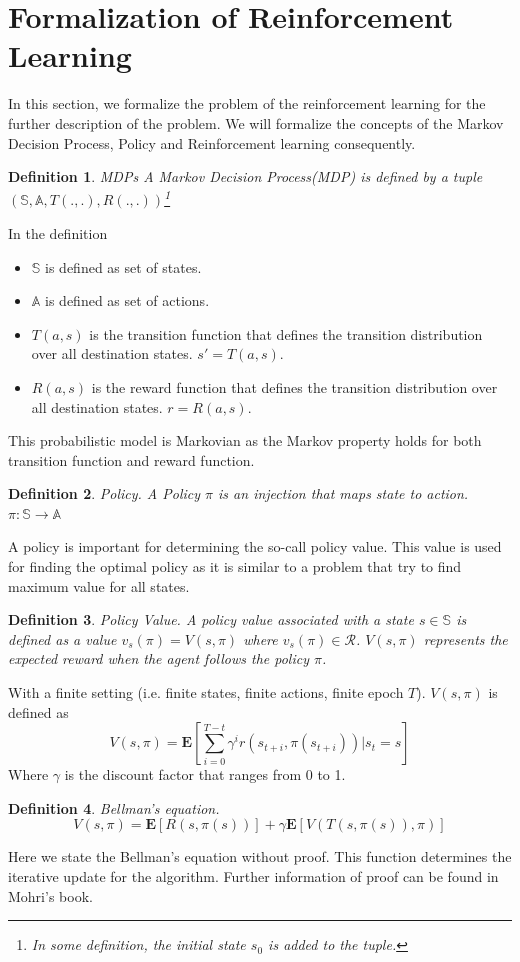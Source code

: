 \documentclass{article}
\newtheorem{mydef}{Definition}
\begin{document}
\section{Formalization of Reinforcement Learning}
In this section, we formalize the problem of the reinforcement learning for the further description of the problem. We will formalize the concepts of the Markov Decision Process, Policy and Reinforcement learning consequently.
\begin{mydef}
MDPs
A Markov Decision Process(MDP) is defined by a tuple $(\mathbb{S},\mathbb{A},T(.,.),R(.,.))$\footnote{In some definition, the initial state $s_0$ is added to the tuple.}
\end{mydef}
In the definition
\begin{itemize}
\item $\mathbb{S}$ is defined as set of states.
\item $\mathbb{A}$ is defined as set of actions.
\item $T(a,s)$ is the transition function that defines the transition distribution over all destination states. $s' = T(a,s)$.
\item $R(a,s)$ is the reward function that defines the transition distribution over all destination states. $r = R(a,s)$.
\end{itemize}
This probabilistic model is Markovian as the Markov property holds for both transition function and reward function.
\begin{mydef}
\textit{Policy}.
A Policy $\pi$ is an injection that maps state to action. $\pi:\mathbb{S}\rightarrow\mathbb{A}$
\end{mydef}
A policy is important for determining the so-call policy value. This value is used for finding the optimal policy as it is similar to a problem that try to find maximum value for all states.
\begin{mydef}
\textit{Policy Value}.
A policy value associated with a state $s \in \mathbb{S}$ is defined as a value $v_s(\pi) = V(s,\pi)$  where $v_s(\pi)  \in \mathcal{R}$. $V(s,\pi)$ represents the expected reward when the agent follows the policy $\pi$.
\end{mydef}
With a finite setting (i.e. finite states, finite actions, finite epoch $T$). $V(s,\pi)$  is defined as 
\begin{equation}
V(s,\pi) = \mathbf{E}\left[\sum_{i=0}^{T-t}\gamma^i r(s_{t+i},\pi(s_{t+i}))|s_t = s\right]
\end{equation}
Where $\gamma$ is the discount factor that ranges from 0 to 1.
\begin{mydef}
\textit{Bellman's equation}.
\begin{equation}
V(s,\pi) = \mathbf{E}\left[ R(s,\pi(s)) \right]+ \gamma \mathbf{E}\left[V(T(s,\pi(s)),\pi)\right]
\end{equation}\label{bellman}
\end{mydef}
Here we state the Bellman's equation without proof. This function determines the iterative update for the algorithm. Further information of proof can be found in Mohri's book\cite{mohri2012foundations}.
\end{document}
